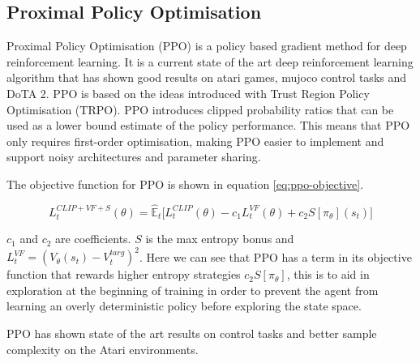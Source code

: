 \documentclass[conference]{IEEEtran}
\begin{document}
\subsection{Proximal Policy Optimisation}

Proximal Policy Optimisation (PPO) is a policy based gradient method for deep reinforcement learning. It is a current state of the art deep reinforcement learning algorithm that has shown good results on atari games, mujoco control tasks\cite{schulman2017proximal} and DoTA 2\cite{OpenAI_dota}. PPO is based on the ideas introduced with Trust Region Policy Optimisation (TRPO)\cite{schulman2015trust}. PPO introduces clipped probability ratios that can be used as a lower bound estimate of the policy performance. This means that PPO only requires first-order optimisation, making PPO easier to implement and support noisy architectures and parameter sharing.



The objective function for PPO is shown in equation \ref{eq:ppo-objective}.

\begin{equation}
    L_t^{CLIP+VF+S}(\theta) = \hat{\mathbb{E}}_t\big[L_t^{CLIP}(\theta)-c_1L_t^{VF}(\theta)+c_2S[\pi_{\theta}](s_t)\big]
    \label{eq:ppo-objective}
\end{equation}

$c_1$ and $c_2$ are coefficients. $S$ is the max entropy bonus and $L_t^{VF} = (V_{\theta}(s_t)-V_t^{targ})^2$. Here we can see that PPO has a term in its objective function that rewards higher entropy strategies $c_2S[\pi_{\theta}]$, this is to aid in exploration at the beginning of training in order to prevent the agent from learning an overly deterministic policy before exploring the state space. 

PPO has shown state of the art results on control tasks and better sample complexity on the Atari environments.
\end{document}
